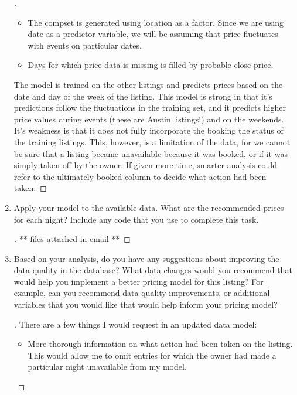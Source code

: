 \documentclass[]{article}
\theoremstyle{definition}
\begin{document}
\begin{enumerate}
\begin{proof}[\unskip\nopunct]
	\begin{itemize}
		\item The compset is generated using location as a factor. Since we are using date as a predictor variable, we will be assuming that price fluctuates with events on particular dates.
		\item Days for which price data is missing is filled by probable close price.

	\end{itemize}

The model is trained on the other listings and predicts prices based on the date and day of the week of the listing. This model is strong in that it's predictions follow the fluctuations in the training set, and it predicts higher price values during events (these are Austin listings!) and on the weekends. It's weakness is that it does not fully incorporate the booking the status of the training listings. This, however, is a limitation of the data, for we cannot be sure that a listing became unavailable because it was booked, or if it was simply taken off by the owner. If given more time, smarter analysis could refer to the ultimately booked column to decide what action had been taken. 

\end{proof}

\item Apply your model to the available data.  What are the recommended prices for each night?  Include any code that you use to complete this task.


\begin{proof}[\unskip\nopunct]\renewcommand{\qedsymbol}{}
		
** files attached in email **

\end{proof}

\item Based on your analysis, do you have any suggestions about improving the data quality in the database?  What data changes would you recommend that would help you implement a better pricing model for this listing?  For example, can you recommend data quality improvements, or additional variables that you would like that would help inform your pricing model?

\begin{proof}[\unskip\nopunct]\renewcommand{\qedsymbol}{}
	There are a few things I would request in an updated data model:

	\begin{itemize}
		\item More thorough information on what action had been taken on the listing. This would allow me to omit entries for which the owner had made a particular night unavailable from my model. 


\end{itemize}
\end{proof}
\end{enumerate}
\end{document}
